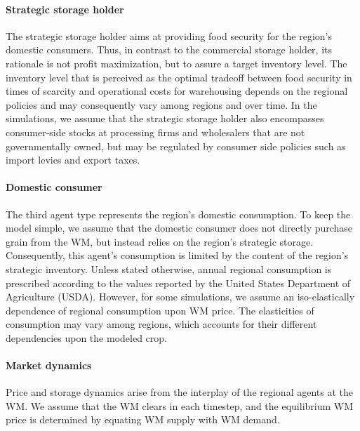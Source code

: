 \documentclass[12pt]{article}
\begin{document}
\paragraph*{Strategic storage holder}
The strategic storage holder aims at providing food security for the region's domestic consumers. Thus, in contrast to the commercial storage holder, its rationale is not profit maximization, but to assure a target inventory level. The inventory level that is perceived as the optimal tradeoff between food security in times of scarcity and operational costs for warehousing depends on the regional policies and may consequently vary among regions and over time. In the simulations, we assume that the strategic storage holder also encompasses consumer-side stocks at processing firms and wholesalers that are not governmentally owned, but may be regulated by consumer side policies such as import levies and export taxes.

\paragraph*{Domestic consumer}
The third agent type represents the region's domestic consumption. To keep the model simple, we assume that the domestic consumer does not directly purchase grain from the WM, but instead relies on the region's strategic storage. Consequently, this agent's consumption is limited by the content of the region's strategic inventory.  Unless stated otherwise, annual regional consumption is prescribed according to the values reported by the United States Department of Agriculture (USDA). However, for some simulations, we assume an iso-elastically dependence of regional consumption upon WM price. The elasticities of consumption may vary among regions, which accounts for their different dependencies upon the modeled crop.

\paragraph*{Market dynamics}
Price and storage dynamics arise from the interplay of the regional agents at the WM. We assume that the WM clears in each timestep, and the equilibrium WM price is determined by equating WM supply with WM demand.
\end{document}
